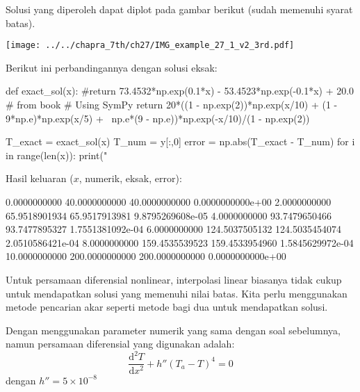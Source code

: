 Solusi yang diperoleh dapat diplot pada gambar berikut (sudah memenuhi syarat batas).

{\centering
\texttt{[image: ../../chapra\_7th/ch27/IMG\_example\_27\_1\_v2\_3rd.pdf]}
\par}


Berikut ini perbandingannya dengan solusi eksak:
\begin{pythoncode}
def exact_sol(x):
    #return 73.4532*np.exp(0.1*x) - 53.4523*np.exp(-0.1*x) + 20.0 # from book
    # Using SymPy
    return 20*((1 - np.exp(2))*np.exp(x/10) + (1 - 9*np.e)*np.exp(x/5) + \
            np.e*(9 - np.e))*np.exp(-x/10)/(1 - np.exp(2))

T_exact = exact_sol(x)
T_num = y[:,0]
error = np.abs(T_exact - T_num)
for i in range(len(x)):
    print("%
\end{pythoncode}

Hasil keluaran ($x$, numerik, eksak, error):
\begin{textcode}
    0.0000000000      40.0000000000      40.0000000000 0.0000000000e+00
    2.0000000000      65.9518901934      65.9517913981 9.8795269608e-05
    4.0000000000      93.7479650466      93.7477895327 1.7551381092e-04
    6.0000000000     124.5037505132     124.5035454074 2.0510586421e-04
    8.0000000000     159.4535539523     159.4533954960 1.5845629972e-04
   10.0000000000     200.0000000000     200.0000000000 0.0000000000e+00
\end{textcode}


Untuk persamaan diferensial nonlinear, interpolasi linear biasanya
tidak cukup untuk mendapatkan solusi yang memenuhi nilai batas.
Kita perlu menggunakan metode pencarian akar seperti metode bagi
dua untuk mendapatkan solusi.

\begin{soal}
Dengan menggunakan parameter numerik yang sama dengan soal sebelumnya, namun
persamaan diferensial yang digunakan adalah:
\begin{equation*}
\frac{\mathrm{d}^2 T}{\mathrm{d}x^2} + h''(T_a - T)^4 = 0
\end{equation*}
dengan $h'' = 5\times 10^{-8}$
\end{soal}


